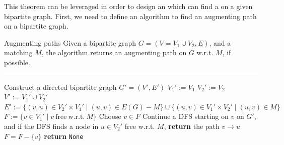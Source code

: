 \documentclass[a4paper, 12pt]{report}
\begin{document}
    This theorem can be leveraged in order to design an  which can find a  on a given bipartite graph. First, we need to define an algorithm to find an augmenting path on a bipartite graph.

    \begin{framedalgo}[label={alg:augmenting_path}]{Augmenting paths}
        Given a bipartite graph $G = (V = V_1 \cup V_2, E)$, and a matching $M$, the algorithm returns an augmenting path on $G$ w.r.t. $M$, if possible. \\
        \hrule

        \quad
        \begin{algorithmic}[1]
                \State Construct a directed bipartite graph $G' = (V', E')$
                \State $V_1' := V_1$
                \State $V_2' := V_2$
                \State $V' := V_1' \cup V_2'$
                \State $E' := \{(v, u) \in V_2' \times V_1' \mid (u, v) \in E(G) - M\} \cup \{(u, v) \in V_1' \times V_2' \mid (u, v) \in M\}$
                \State $F := \{v \in V_1' \mid v \mathrm{\ free \ w.r.t. \ } M\}$
                    \State Choose $v \in F$
                    \State Continue a DFS starting on $v$ on $G'$, and if the DFS finds a node in $u \in V_2'$ free w.r.t. $M$, \textbf{return} the path $v \to u$
                    \State $F = F - \{v\}$
                \EndWhile
                \State \textbf{return} \texttt{None}
            \EndFunction
        \end{algorithmic}
    \end{framedalgo}


\end{document}
